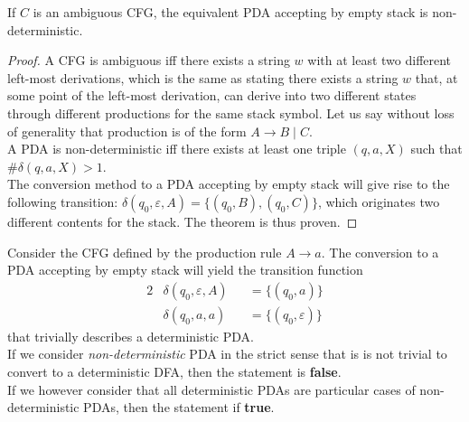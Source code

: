 \documentclass[docid=CA08]{tcom_CA}
\begin{document}
\setcounter{chapter}{7}
{
\renewcommand{\thesubsubsection}{\thesubsection\alph{subsubsection}}
\begin{theorem}
If $C$ is an ambiguous CFG, the equivalent PDA accepting by empty stack is non-deterministic.
\end{theorem}
\begin{proof}
A CFG is ambiguous iff there exists a string $w$ with at least two different left-most derivations, which is the same as stating there exists a string $w$ that, at some point of the left-most derivation, can derive into two different states through different productions for the same stack symbol. Let us say without loss of generality that production is of the form $A \rightarrow B\mid C$.\\
A PDA is non-deterministic iff there exists at least one triple $(q,a,X)$ such that $\#\delta(q, a, X) > 1$.\\
The conversion method to a PDA accepting by empty stack will give rise to the following transition: $\delta(q_0, \varepsilon, A)=\{(q_0,B),(q_0,C)\}$, which originates two different contents for the stack. The theorem is thus proven.
\end{proof}
Consider the CFG defined by the production rule $A \rightarrow a$. The conversion to a PDA accepting by empty stack will yield the transition function
\begin{alignat*}{2}
	&\delta(q_0,\varepsilon,A) &&= \{(q_0, a)\}\\
	&\delta(q_0,a          ,a) &&= \{(q_0, \varepsilon)\} 
\end{alignat*}
that trivially describes a deterministic PDA.\\
If we consider \textit{non-deterministic} PDA in the strict sense that is is not trivial to convert to a deterministic DFA, then the statement is \textbf{false}.\\
If we however consider that all deterministic PDAs are particular cases of non-deterministic PDAs, then the statement if \textbf{true}.
}
\end{document}
